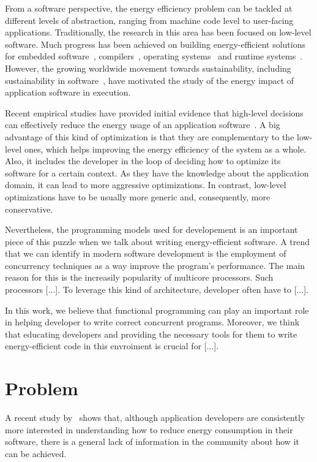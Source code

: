 From a software perspective, the energy efficiency problem can be tackled at different levels of abstraction, ranging from machine code level to user-facing applications. Traditionally, the research in this area has been focused on low-level software. Much progress has been achieved on building energy-efficient solutions for embedded software~\cite{tiwari:1994}, compilers~\cite{hsu:2003}, operating systems~\cite{merkel:2006} and runtime systems~\cite{ribic:2014, farkas:2000}. However, the growing worldwide movement towards sustainability, including sustainability in software~\cite{becker:2015}, have motivated the study of the energy impact of application software in execution.

Recent empirical studies have provided initial evidence that high-level decisions can effectively reduce the energy usage of an application software~\cite{hindle:2012,trefethen:2013,pinto:2014,sahin:2014}. A big advantage of this kind of optimization is that they are complementary to the low-level ones, which helps improving the energy efficiency of the system as a whole. Also, it includes the developer in the loop of deciding how to optimize its software for a certain context. As they have the knowledge about the application domain, it can lead to more aggressive optimizations. In contrast, low-level optimizations have to be usually more generic and, consequently, more conservative.

Nevertheless, the programming models used for developement is an important piece of this puzzle when we talk about writing energy-efficient software. A trend that we can identify in modern software development is the employment of concurrency techniques as a way improve the program's performance. The main reason for this is the increasily popularity of multicore processors. Such processors [...]. To leverage this kind of architecture, developer often have to [...]. %


In this work, we believe that functional programming can play an important role in helping developer to write correct concurrent programs. Moreover, we think that educating developers and providing the necessary tools for them to write energy-efficient code in this envroiment is crucial for [...].


\section{Problem}
A recent study by~ shows that, although application developers are consistently more interested in understanding how to reduce energy consumption in their software, there is a general lack of information in the community about how it can be achieved.


